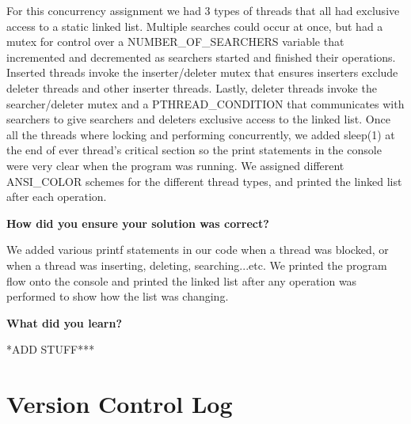\documentclass[10pt,letterpaper,draftclsnofoot,onecolumn]{IEEEtran}
\begin{document}
\noindent For this concurrency assignment we had 3 types of threads that all had exclusive access to a static linked list. Multiple searches could occur at once, but had a mutex for control over a NUMBER\_OF\_SEARCHERS variable that incremented and decremented as searchers started and finished their operations. Inserted threads invoke the inserter/deleter mutex that ensures inserters exclude deleter threads and other inserter threads. Lastly, deleter threads invoke the searcher/deleter mutex and a PTHREAD\_CONDITION that communicates with searchers to give searchers and deleters exclusive access to the linked list. Once all the threads where locking and performing concurrently, we added sleep(1) at the end of ever thread's critical section so the print statements in the console were very clear when the program was running. We assigned different ANSI\_COLOR schemes for the different thread types, and printed the linked list after each operation.

\bigskip

\noindent\textbf{How did you ensure your solution was correct?}
\medskip

\medskip

\noindent We added various printf statements in our code when a thread was blocked, or when a thread was inserting, deleting, searching...etc. We printed the program flow onto the console and printed the linked list after any operation was performed to show how the list was changing.
\bigskip

\noindent\textbf{What did you learn?}
\medskip

\medskip

\noindent **ADD STUFF***
\medskip


\section{Version Control Log}
\bigskip
\end{document}
